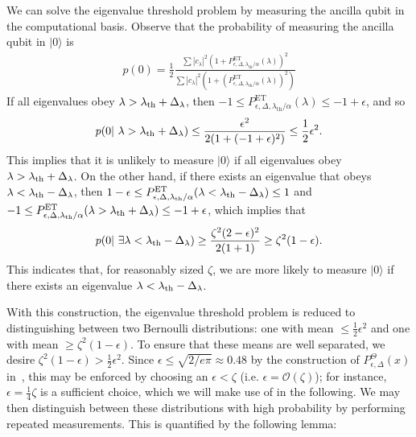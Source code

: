 \documentclass[aps,pra,showpacs,notitlepage,twocolumn,superscriptaddress,nofootinbib]{revtex4-1}
\begin{document}
    We can solve the eigenvalue threshold problem by measuring the ancilla qubit in the computational basis. Observe that the probability of measuring the ancilla qubit in $|0\rangle$ is 
    \begin{equation}
    \begin{gathered}
        p(0) = \frac{1}{2} \frac{\sum |c_\lambda|^2 (1+P^{\text{ET}}_{\epsilon,\Delta,\lambda_{\text{th}}/\alpha}(\lambda))^2}{\sum |c_\lambda|^2  (1+(P^{\text{ET}}_{\epsilon,\Delta,\lambda_{\text{th}}/\alpha}(\lambda))^2)}
    \end{gathered}
    \end{equation}
    If all eigenvalues obey $\lambda > \lambda_{\rm th} + \Delta_\lambda$, then $-1 \leq P^{\text{ET}}_{\epsilon,\Delta,\lambda_{\text{th}}/\alpha}(\lambda) \leq -1+\epsilon$, and so
    \begin{equation}
    \begin{gathered}
        p(0 | \  \lambda > \lambda_{\rm th} + \Delta_\lambda) \leq \frac{\epsilon^2}{2(1+(-1+\epsilon)^2)} \leq \frac{1}{2}\epsilon^2.
    \end{gathered}
    \end{equation}
    This implies that it is unlikely to measure $|0\rangle$ if all eigenvalues obey $\lambda > \lambda_{\rm th} + \Delta_\lambda$. On the other hand, if there exists an eigenvalue that obeys $\lambda < \lambda_{\rm th} - \Delta_\lambda$, then $1-\epsilon \leq P^{\text{ET}}_{\epsilon,\Delta,\lambda_{\text{th}}/\alpha}(\lambda < \lambda_{\rm th} - \Delta_\lambda) \leq 1$ and $-1 \leq P^{\text{ET}}_{\epsilon,\Delta,\lambda_{\text{th}}/\alpha}(\lambda > \lambda_{\rm th} + \Delta_\lambda) \leq -1+\epsilon$, which implies that 
    \begin{equation}
    \begin{gathered}
        p(0 | \  \exists \lambda < \lambda_{\rm th} - \Delta_\lambda) \geq \frac{\zeta^2(2-\epsilon)^2}{2(1+1)} \geq \zeta^2(1-\epsilon).
    \end{gathered}
    \end{equation}
    This indicates that, for reasonably sized $\zeta$, we are more likely to measure $|0\rangle$ if there exists an eigenvalue $\lambda < \lambda_{\rm th} - \Delta_\lambda$.
    
    With this construction, the eigenvalue threshold problem is reduced to distinguishing between two Bernoulli distributions: one with mean $\leq \frac{1}{2}\epsilon^2$ and one with mean $\geq \zeta^2(1-\epsilon)$. To ensure that these means are well separated, we desire $\zeta^2(1-\epsilon) > \frac{1}{2}\epsilon^2$. Since $\epsilon \leq \sqrt{2/e\pi} \approx 0.48$ by the construction of $P^{\Theta}_{\epsilon, \Delta}(x)$ in~\cite{low2017quantum}, this may be enforced by choosing an $\epsilon < \zeta$ (i.e. $\epsilon = \mathcal{O}(\zeta)$); for instance, $\epsilon = \frac{1}{4}\zeta$ is a sufficient choice, which we will make use of in the following. We may then distinguish between these distributions with high probability by performing repeated measurements. This is quantified by the following lemma:
    
\end{document}
